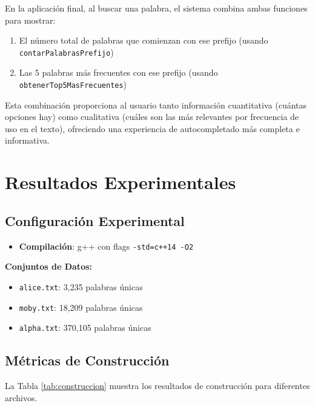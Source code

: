 \documentclass[11pt,a4paper]{article}
\begin{document}
En la aplicación final, al buscar una palabra, el sistema combina ambas funciones para mostrar:
\begin{enumerate}
    \item El número total de palabras que comienzan con ese prefijo (usando \texttt{contarPalabrasPrefijo})
    \item Las 5 palabras más frecuentes con ese prefijo (usando \texttt{obtenerTop5MasFrecuentes})
\end{enumerate}

Esta combinación proporciona al usuario tanto información cuantitativa (cuántas opciones hay) como cualitativa (cuáles son las más relevantes por frecuencia de uso en el texto), ofreciendo una experiencia de autocompletado más completa e informativa.

\section{Resultados Experimentales}

\subsection{Configuración Experimental}

\begin{itemize}
    \item \textbf{Compilación}: g++ con flags \texttt{-std=c++14 -O2}
\end{itemize}

\textbf{Conjuntos de Datos:}
\begin{itemize}
    \item \texttt{alice.txt}: 3,235 palabras únicas
    \item \texttt{moby.txt}: 18,209 palabras únicas
    \item \texttt{alpha.txt}: 370,105 palabras únicas
\end{itemize}

\subsection{Métricas de Construcción}

La Tabla \ref{tab:construccion} muestra los resultados de construcción para diferentes archivos.
\end{document}
